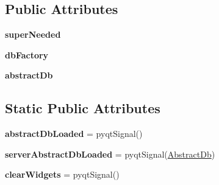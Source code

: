 \subsection*{Public Attributes}
\begin{DoxyCompactItemize}
\item 
\mbox{\label{class_dsg_tools_1_1_custom_widgets_1_1explore_server_widget_1_1_explore_server_widget_a1679b75122b339ffaf9eb5c8a16ceeae}} 
{\bfseries super\+Needed}
\item 
\mbox{\label{class_dsg_tools_1_1_custom_widgets_1_1explore_server_widget_1_1_explore_server_widget_a588b67c9c35aed677787fd8e3a690233}} 
{\bfseries db\+Factory}
\item 
\mbox{\label{class_dsg_tools_1_1_custom_widgets_1_1explore_server_widget_1_1_explore_server_widget_a801efd82cc7d27cff1281ecbca5139d6}} 
{\bfseries abstract\+Db}
\end{DoxyCompactItemize}
\subsection*{Static Public Attributes}
\begin{DoxyCompactItemize}
\item 
\mbox{\label{class_dsg_tools_1_1_custom_widgets_1_1explore_server_widget_1_1_explore_server_widget_a3c870868a25b21c1f4ec7ccc97277f2d}} 
{\bfseries abstract\+Db\+Loaded} = pyqt\+Signal()
\item 
\mbox{\label{class_dsg_tools_1_1_custom_widgets_1_1explore_server_widget_1_1_explore_server_widget_a388f83866544aa3f78679a3d927c08d8}} 
{\bfseries server\+Abstract\+Db\+Loaded} = pyqt\+Signal(\mbox{\hyperlink{class_dsg_tools_1_1_factories_1_1_db_factory_1_1abstract_db_1_1_abstract_db}{Abstract\+Db}})
\item 
\mbox{\label{class_dsg_tools_1_1_custom_widgets_1_1explore_server_widget_1_1_explore_server_widget_afe2fbd336c12980a038b90e68f86994c}} 
{\bfseries clear\+Widgets} = pyqt\+Signal()
\end{DoxyCompactItemize}


